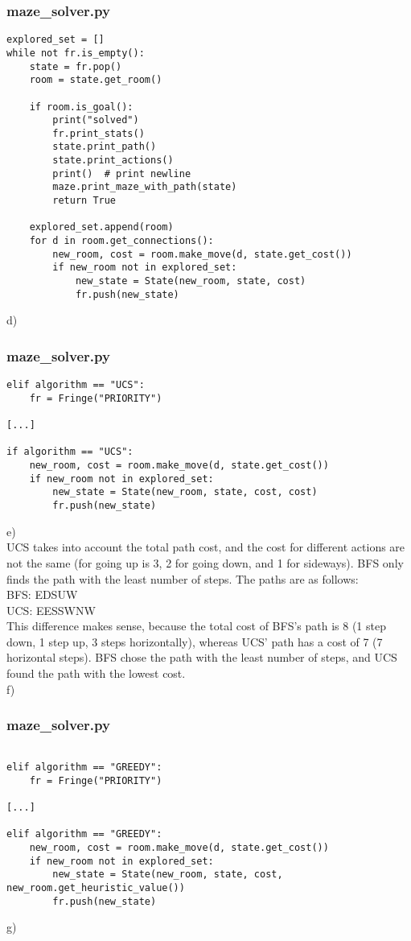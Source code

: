 \documentclass{article}
\begin{document}
\subsubsection*{maze\_solver.py}
\begin{lstlisting}
explored_set = []
while not fr.is_empty():
    state = fr.pop()
    room = state.get_room()

    if room.is_goal():
        print("solved")
        fr.print_stats()
        state.print_path()
        state.print_actions()
        print()  # print newline
        maze.print_maze_with_path(state)
        return True
            
    explored_set.append(room)
    for d in room.get_connections():
        new_room, cost = room.make_move(d, state.get_cost())
        if new_room not in explored_set:
            new_state = State(new_room, state, cost)
            fr.push(new_state) 
\end{lstlisting}
d)
\subsubsection*{maze\_solver.py}
\begin{lstlisting}
elif algorithm == "UCS":
    fr = Fringe("PRIORITY")

[...]

if algorithm == "UCS":
    new_room, cost = room.make_move(d, state.get_cost()) 
    if new_room not in explored_set:                      
        new_state = State(new_room, state, cost, cost)    
        fr.push(new_state)
\end{lstlisting}
e)
\\
UCS takes into account the total path cost, and the cost for different actions are not the same (for going up is 3, 2 for going down, and 1 for sideways). BFS only finds the path with the least number of steps. The paths are as follows:
\\BFS: EDSUW
\\UCS: EESSWNW
\\
This difference makes sense, because the total cost of BFS's path is 8 (1 step down, 1 step up, 3 steps horizontally), whereas UCS' path has a cost of 7 (7 horizontal steps). BFS chose the path with the least number of steps, and UCS found the path with the lowest cost.
\\
f)
\subsubsection*{maze\_solver.py}
\begin{lstlisting}

elif algorithm == "GREEDY":
    fr = Fringe("PRIORITY")

[...]

elif algorithm == "GREEDY":
    new_room, cost = room.make_move(d, state.get_cost()) 
    if new_room not in explored_set:                               
        new_state = State(new_room, state, cost, new_room.get_heuristic_value())    
        fr.push(new_state) 
\end{lstlisting}
g)
\end{document}
